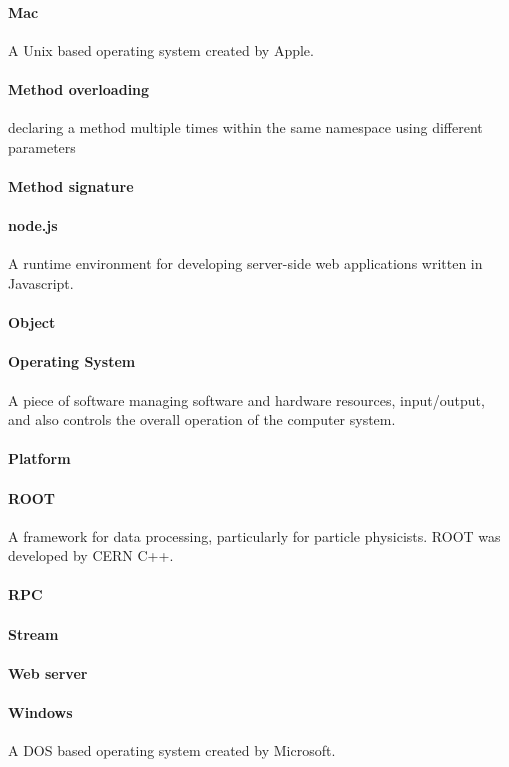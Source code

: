 \paragraph{Mac}
A Unix based operating system created by Apple.
\paragraph{Method overloading}
declaring a method multiple times within the same namespace using different parameters
\paragraph{Method signature}

\paragraph{node.js}
A runtime environment for developing server-side web applications written in Javascript. 

\paragraph{Object}

\paragraph{Operating System}
A piece of software managing software and hardware resources, input/output, and also controls the overall operation of the computer system.
\paragraph{Platform}

\paragraph{ROOT}
A framework for data processing, particularly for particle physicists. ROOT was developed by CERN C++.


\paragraph{RPC}

\paragraph{Stream}

\paragraph{Web server}

\paragraph{Windows}
A DOS based operating system created by Microsoft.